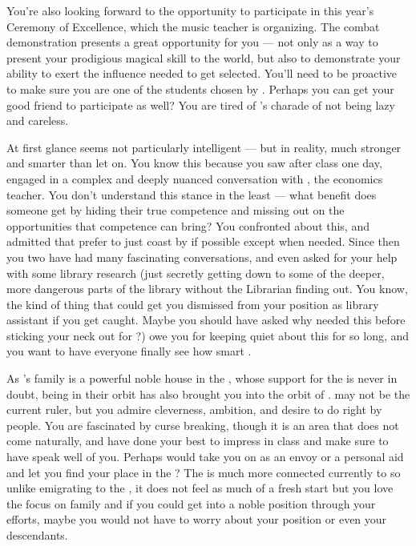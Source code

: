 \documentclass[char]{GL2020}
\begin{document}
You're also looking forward to the opportunity to participate in this year's Ceremony of Excellence, which the music teacher \cMusic{\intro} is organizing. The combat demonstration presents a great opportunity for you — not only as a way to present your prodigious magical skill to the world, but also to demonstrate your ability to exert the influence needed to get selected. You'll need to be proactive to make sure you are one of the students chosen by \cMusic{}. Perhaps you can get your good friend \cChupStudent{\intro} to participate as well? You are tired of \cChupStudent{}’s charade of not being lazy and careless.

At first glance \cChupStudent{} seems not particularly intelligent — but in reality, \cChupStudent{\theyare} much stronger and smarter than \cChupStudent{\they} let\cChupStudent{\verbs} on. You know this because you saw \cChupStudent{} after class one day, engaged in a complex and deeply nuanced conversation with \cChupSecond{\intro}, the economics teacher. You don't understand this stance in the least — what benefit does someone get by hiding their true competence and missing out on the opportunities that competence can bring? You confronted \cChupStudent{\them} about this, and \cChupStudent{\they} admitted that \cChupStudent{\they} prefer\cChupStudent{\verbs} to just coast by if possible except when needed. Since then you two have had many fascinating conversations, and \cChupStudent{\theyhave} even asked for your help with some library research (just secretly getting down to some of the deeper, more dangerous parts of the library without the Librarian finding out. You know, the kind of thing that could get you dismissed from your position as library assistant if you get caught. Maybe you should have asked why \cChupStudent{} needed this before sticking your neck out for \cChupStudent{\them}?) \cChupStudent{\They} owe\cChupStudent{\verbs} you for keeping quiet about this for so long, and you want to have everyone finally see how smart \cChupStudent{\theyare}.

As \cChupStudent{}’s family is a powerful noble house in the \pFarm{}, whose support for the \cQueen{\intro} is never in doubt, being in their orbit has also brought you into the orbit of \cPrince{\intro}. \cPrince{\They} may not be the current ruler, but you admire \cPrince{\their} cleverness, \cPrince{\their} ambition, and \cPrince{\their} desire to do right by \cPrince{\their} people. You are fascinated by curse breaking, though it is an area that does not come naturally, and have done your best to impress \cPrince{\them} in class and make sure to have \cChupStudent{} speak well of you. Perhaps \cPrince{\they} would take you on as an envoy or a personal aid and let you find your place in the \pFarm{}? The \pFarm{} is much more connected currently to \pTech{} so unlike emigrating to the \pShip{}, it does not feel as much of a fresh start but you love the focus on family and if you could get into a noble position through your efforts, maybe you would not have to worry about your position or even your descendants. 
\end{document}
